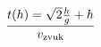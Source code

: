 \documentclass[preview]{standalone}
\begin{document}
\begin{align*}
t( h ) = \sqrt 2{{h } \over {g}} +  h \over{v_{\text{zvuk}}}
\end{align*}
\end{document}
